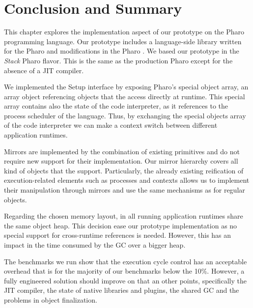 \section{Conclusion and Summary}

This chapter explores the implementation aspect of our \Vtt prototype on the Pharo programming language. Our prototype includes a language-side library written for the Pharo and modifications in the Pharo \VM. We based our prototype in the \emph{Stack} Pharo \VM flavor. This \VM is the same as the production Pharo \VM except for the absence of a JIT compiler.

We implemented the \VM Setup interface by exposing Pharo's special object array, an array object referencing objects that the \VM access directly at runtime. This special array contains also the state of the code interpreter, as it references to the process scheduler of the language. Thus, by exchanging the special objects array of the \VM code interpreter we can make a context switch between different application runtimes.

Mirrors are implemented by the combination of existing \VM primitives and do not require new \VM support for their implementation. Our mirror hierarchy covers all kind of objects that the \VM support. Particularly, the already existing reification of execution-related elements such as processes and contexts allows us to implement their manipulation through mirrors and use the same mechanisms as for regular objects.

Regarding the chosen memory layout, in \Vtt all running application runtimes share the same object heap. This decision ease our prototype implementation as no special support for cross-runtime references is needed. However, this has an impact in the time consumed by the GC over a bigger heap.

The benchmarks we run show that the execution cycle control has an acceptable overhead that is for the majority of our benchmarks below the 10\%. However, a fully engineered solution should improve on that an other points, specifically the JIT compiler, the state of native libraries and plugins, the shared GC and the problems in object finalization.

